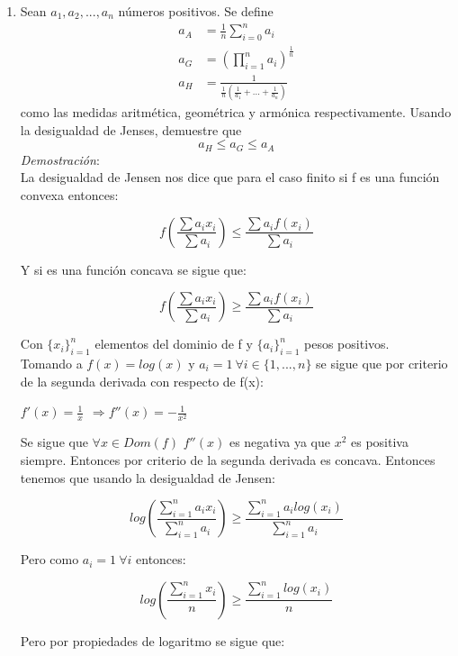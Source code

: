 \documentclass[12pt,a4paper]{report}
\begin{document}
\begin{enumerate}
		\item{
			Sean $a_1, a_2, ..., a_n$ números positivos. Se define
			\begin{align*}
				a_A &= \frac{1}{n}\sum_{i = 0}^{n}{a_i}\\
				a_G &= (\prod_{i = 1}^{n}{a_i})^{\frac{1}{n}}\\
				a_H &= \frac{1}{\frac{1}{n}(\frac{1}{a_1} + ...
				+ \frac{1}{a_n})}
			\end{align*}
			como las medidas aritmética, geométrica y armónica respectivamente.
			Usando la desigualdad de Jenses, demuestre que
			\[a_H \leq a_G \leq a_A\]
			\textit{Demostración}:\\
		    La desigualdad de Jensen nos dice que para el caso finito si f es una función convexa entonces:
			\begin{center}
			    $$f(\frac{\sum a_{i}x_{i}}{\sum a_{i}})\leq \frac{\sum a_{i}f(x_{i})}{\sum a_{i}}$$
			\end{center}
			Y si es una función concava se sigue que:\\
			\begin{center}
			    $$f(\frac{\sum a_{i}x_{i}}{\sum a_{i}})\geq \frac{\sum a_{i}f(x_{i})}{\sum a_{i}}$$
			\end{center}
			Con $\lbrace x_{i} \rbrace _{i=1}^{n}$ elementos del dominio de f y $\lbrace a_{i} \rbrace _{i=1}^{n}$ pesos positivos.\\
		   Tomando a $f(x)=log(x)$ y $a_{i}=1 \ \forall i\in \lbrace 1,...,n \rbrace$ se sigue que por criterio de la segunda derivada con respecto de f(x):\\
		   \begin{center}
		       $f'(x)=\frac{1}{x} \ \ \Rightarrow  f''(x)=-\frac{1}{x^2}$
		   \end{center}
		   Se sigue que $\forall x\in Dom(f)$ $f''(x)$ es negativa  ya que $x^2$ es positiva siempre. Entonces por criterio de la segunda derivada es concava. Entonces tenemos que usando la desigualdad de Jensen:\\
		   \begin{center}
		       $$log(\frac{\sum_{i=1}^{n} a_{i}x_{i}}{\sum_{i=1}^{n} a_{i}})\geq \frac{\sum_{i=1}^{n} a_{i}log(x_{i})}{\sum_{i=1}^{n} a_{i}}$$
		   \end{center}
		   Pero como $a_{i}=1 \ \forall i$ entonces:
		   \begin{center}
		       $$log(\frac{\sum_{i=1}^{n}x_{i}}{n})\geq \frac{\sum_{i=1}^{n}log(x_{i})}{n}$$
		   \end{center}
		   Pero por propiedades de logaritmo se sigue que:
}
\end{enumerate}
\end{document}

